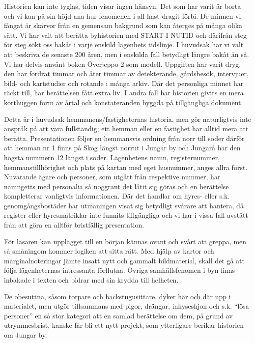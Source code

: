 
%

Historien kan inte tyglas, tiden visar ingen hänsyn. Det som har varit är borta och vi kan på sin höjd ana hur fenomenen i all hast dragit förbi. De minnen vi fångat är skärvor från en gemensam bakgrund som kan återges på många olika sätt. Vi har valt att berätta byhistorien med START I NUTID och därifrån steg för steg sökt oss bakåt i varje enskild lägenhets tidslinje. I huvudsak har vi valt att beskriva de senaste 200 åren, men i enskilda fall betydligt längre bakåt än så. Vi har delvis använt boken Överjeppo 2 som modell. Uppgiften har varit dryg, den har fordrat timmar och åter timmar av detekterande, gårdsbesök, intervjuer, bild- och kartstudier och rotande i många arkiv. Där det personliga minnet har räckt till, har berättelsen fått extra liv. I andra fall har historien givits en mera korthuggen form av årtal och konstateranden byggda på tillgängliga dokument.

Detta är i huvudsak hemmanens/fastigheternas historia, men gör naturligtvis inte anspråk på att vara fullständig; ett hemman eller en fastighet har alltid mera att berätta. Presentationen följer en hemmansvis ordning från norr till söder därför  att hemman nr 1 finns på Skog längst norrut i Jungar by och Jungarå har den högsta nummern 12 längst i söder. Lägenhetens namn, registernummer, hemmanstillhörighet och plats på kartan med eget husnummer, anges allra först. Nuvarande ägare och personer, som utgått från respektive nummer, har namngetts med personalia så noggrant det låtit sig göras och en berättelse kompletterar vanligtvis informationen. Där det handlar om hyres- eller s.k. genomgångsbostäder har utmaningen visat sig betydligt svårare att hantera, då register eller hyresmatriklar inte funnits tillgängliga och vi har i vissa fall avstått från att göra en alltför bristfällig presentation.

För läsaren kan upplägget till en början kännas ovant och svårt att greppa, men så småningom kommer logiken att sitta rätt. Med hjälp av kartor och marginalnoteringar jämte insatt nytt och gammalt bildmaterial, skall det gå att följa lägenheternas intressanta förflutna. Övriga samhällsfenomen i byn finns inbakade i texten och bidrar med sin krydda till helheten.

De obesuttna, såsom torpare och backstugusittare, dyker här och där upp i materialet, men utgör tillsammans med pigor, drängar, inhyseshjon och s.k. ``lösa personer'' en så stor kategori att en samlad berättelse om dem, på grund av utrymmesbrist, kanske får bli ett nytt projekt, som ytterligare berikar historien om Jungar by.

